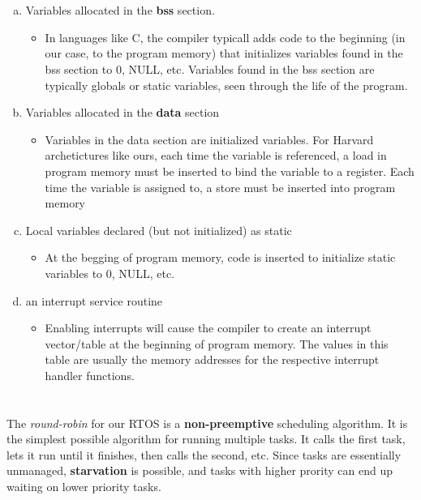 \documentclass[11pt,letterpaper]{article}
\begin{document}
\section{}
\begin{enumerate}[(a)]
	\item Variables allocated in the \textbf{bss} section.
		\begin{itemize}
			\item In languages like C, the compiler typicall adds code to the beginning (in our case, to the
				program memory) that initializes variables found in the bss section to 0, NULL, etc.
				Variables found in the bss section are typically globals or static variables, seen through
				the life of the program.
		\end{itemize}
	\item Variables allocated in the \textbf{data} section
		\begin{itemize}
			\item Variables in the data section are initialized variables. For Harvard archetictures like ours,
				each time the variable is referenced, a load in program memory must be inserted to
				bind the variable to a register. Each time the variable is assigned to, a store must be
				inserted into program memory 
		\end{itemize}
	\item Local variables declared (but not initialized) as static
		\begin{itemize}
			\item At the begging of program memory, code is inserted to initialize static variables to 0,
				NULL, etc.
		\end{itemize}
	\item an interrupt service routine
		\begin{itemize}
			\item Enabling interrupts will cause the compiler to create an interrupt vector/table at
				the beginning of program memory. The values in this table are usually the memory
				addresses for the respective interrupt handler functions.
		\end{itemize}
\end{enumerate}


\section{}
The \textit{round-robin} for our RTOS is a \textbf{non-preemptive} scheduling algorithm. It is the simplest
possible algorithm for running multiple tasks. It calls the first task, lets it run until it finishes, then calls the
second, etc. Since tasks are essentially unmanaged, \textbf{starvation} is possible, and tasks with 
higher prority can end up waiting on lower priority tasks.
\end{document}
